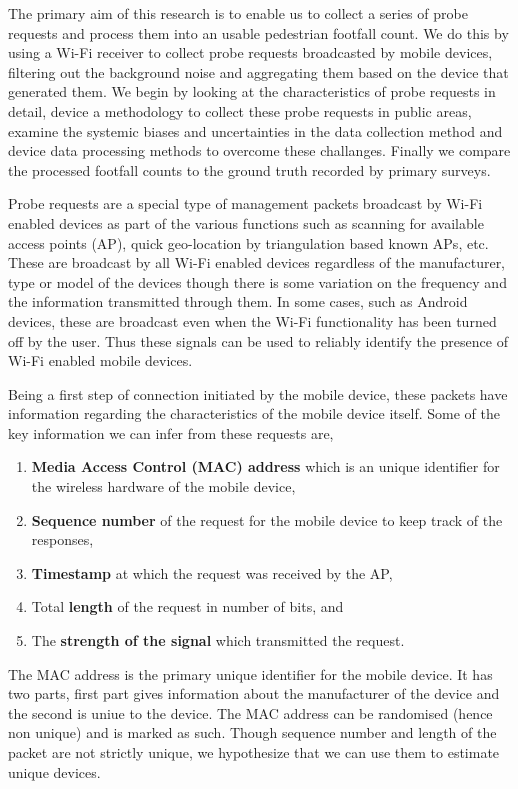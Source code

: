 The primary aim of this research is to enable us to collect a series of probe requests and process them into an usable pedestrian footfall count. We do this by using a Wi-Fi receiver to collect probe requests broadcasted by mobile devices, filtering out the background noise and aggregating them based on the device that generated them. We begin by looking at the characteristics of probe requests in detail, device a methodology to collect these probe requests in public areas, examine the systemic biases and uncertainties in the data collection method and device data processing methods to overcome these challanges. Finally we compare the processed footfall counts to the ground truth recorded by primary surveys.

Probe requests are a special type of management packets broadcast by Wi-Fi enabled devices as part of the various functions such as scanning for available access points (AP), quick geo-location by triangulation based known APs, etc.
These are broadcast by all Wi-Fi enabled devices regardless of the manufacturer, type or model of the devices though there is some variation on the frequency and the information transmitted through them.
In some cases, such as Android devices, these are broadcast even when the Wi-Fi functionality has been turned off by the user.
Thus these signals can be used to reliably identify the presence of Wi-Fi enabled mobile devices.

Being a first step of connection initiated by the mobile device, these packets have information regarding the characteristics of the mobile device itself. Some of the key information we can infer from these requests are,
\begin{enumerate}
	\item \textbf{Media Access Control (MAC) address} which is an unique identifier for the wireless hardware of the mobile device,
	\item \textbf{Sequence number} of the request for the mobile device to keep track of the responses,
	\item \textbf{Timestamp} at which the request was received by the AP,
	\item Total \textbf{length} of the request in number of bits, and 
	\item The \textbf{strength of the signal} which transmitted the request.
\end{enumerate}
The MAC address is the primary unique identifier for the mobile device.
It has two parts, first part gives information about the manufacturer of the device and the second is uniue to the device. The MAC address can be randomised (hence non unique) and is marked as such. Though sequence number and length of the packet are not strictly unique, we hypothesize that we can use them to estimate unique devices.

